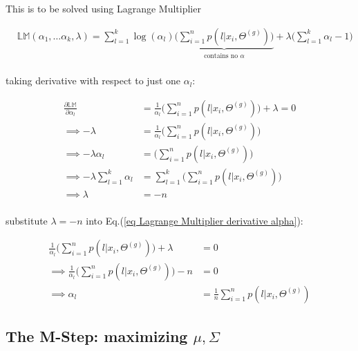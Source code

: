\documentclass{article}
\begin{document}
This is to be solved using Lagrange Multiplier

\begin{equation}\begin{split}
&\mathbb{LM}(\alpha_1,\dots \alpha_k, \lambda) =  \sum_{l=1}^k \log ( \alpha_{l}) \underbrace{\bigg( \sum_{i=1}^{n}   p(l|x_i,\Theta^{(g)}) \bigg)}_{\text{contains no } \alpha} + \lambda \bigg(\sum_{l=1}^k \alpha_l  -1  \bigg)\\
\end{split}\end{equation}

taking derivative with respect to just one $\alpha_l$:

\begin{equation}\begin{split}\label{eq Lagrange Multiplier derivative alpha}
\frac{\partial \mathbb{LM}}{\partial \alpha_l} &= \frac{1}{\alpha_l} \bigg( \sum_{i=1}^{n}   p(l|x_i,\Theta^{(g)}) \bigg) + \lambda = 0\\
\implies -\lambda &= \frac{1}{\alpha_l} \bigg( \sum_{i=1}^{n}   p(l|x_i,\Theta^{(g)}) \bigg)\\
\implies -\lambda  \alpha_l &= \bigg( \sum_{i=1}^{n}   p(l|x_i,\Theta^{(g)}) \bigg)\\
\implies -\lambda\sum_{l=1}^k \alpha_l &=\sum_{l=1}^k   \bigg( \sum_{i=1}^{n}   p(l|x_i,\Theta^{(g)}) \bigg)\\
\implies \lambda  &= - n\\
\end{split}\end{equation}

substitute $\lambda  = - n$ into Eq.(\ref{eq Lagrange Multiplier derivative alpha}):

\begin{equation}\begin{split}
\frac{1}{\alpha_l} \bigg( \sum_{i=1}^{n}   p(l|x_i,\Theta^{(g)}) \bigg) + \lambda &= 0\\
\implies \frac{1}{\alpha_l} \bigg( \sum_{i=1}^{n}   p(l|x_i,\Theta^{(g)}) \bigg) -n &= 0\\
\implies \alpha_l &= \frac{1}{n} \sum_{i=1}^{n}   p(l|x_i,\Theta^{(g)}) 
\end{split}\end{equation}



\subsection{The M-Step: maximizing $\mu, \Sigma$}
\end{document}
